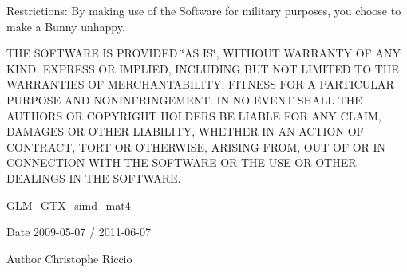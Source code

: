 Restrictions\+: By making use of the Software for military purposes, you choose to make a Bunny unhappy.

T\+H\+E S\+O\+F\+T\+W\+A\+R\+E I\+S P\+R\+O\+V\+I\+D\+E\+D \char`\"{}\+A\+S I\+S\char`\"{}, W\+I\+T\+H\+O\+U\+T W\+A\+R\+R\+A\+N\+T\+Y O\+F A\+N\+Y K\+I\+N\+D, E\+X\+P\+R\+E\+S\+S O\+R I\+M\+P\+L\+I\+E\+D, I\+N\+C\+L\+U\+D\+I\+N\+G B\+U\+T N\+O\+T L\+I\+M\+I\+T\+E\+D T\+O T\+H\+E W\+A\+R\+R\+A\+N\+T\+I\+E\+S O\+F M\+E\+R\+C\+H\+A\+N\+T\+A\+B\+I\+L\+I\+T\+Y, F\+I\+T\+N\+E\+S\+S F\+O\+R A P\+A\+R\+T\+I\+C\+U\+L\+A\+R P\+U\+R\+P\+O\+S\+E A\+N\+D N\+O\+N\+I\+N\+F\+R\+I\+N\+G\+E\+M\+E\+N\+T. I\+N N\+O E\+V\+E\+N\+T S\+H\+A\+L\+L T\+H\+E A\+U\+T\+H\+O\+R\+S O\+R C\+O\+P\+Y\+R\+I\+G\+H\+T H\+O\+L\+D\+E\+R\+S B\+E L\+I\+A\+B\+L\+E F\+O\+R A\+N\+Y C\+L\+A\+I\+M, D\+A\+M\+A\+G\+E\+S O\+R O\+T\+H\+E\+R L\+I\+A\+B\+I\+L\+I\+T\+Y, W\+H\+E\+T\+H\+E\+R I\+N A\+N A\+C\+T\+I\+O\+N O\+F C\+O\+N\+T\+R\+A\+C\+T, T\+O\+R\+T O\+R O\+T\+H\+E\+R\+W\+I\+S\+E, A\+R\+I\+S\+I\+N\+G F\+R\+O\+M, O\+U\+T O\+F O\+R I\+N C\+O\+N\+N\+E\+C\+T\+I\+O\+N W\+I\+T\+H T\+H\+E S\+O\+F\+T\+W\+A\+R\+E O\+R T\+H\+E U\+S\+E O\+R O\+T\+H\+E\+R D\+E\+A\+L\+I\+N\+G\+S I\+N T\+H\+E S\+O\+F\+T\+W\+A\+R\+E.

\hyperlink{group__gtx__simd__mat4}{G\+L\+M\+\_\+\+G\+T\+X\+\_\+simd\+\_\+mat4}

\begin{DoxyDate}{Date}
2009-\/05-\/07 / 2011-\/06-\/07 
\end{DoxyDate}
\begin{DoxyAuthor}{Author}
Christophe Riccio 
\end{DoxyAuthor}
